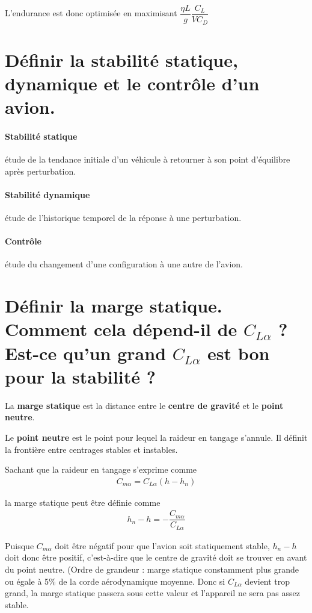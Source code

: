 \documentclass{report}
\begin{document}
L'endurance est donc optimisée en maximisant $\dfrac{\eta L}{g}\dfrac{C_L}{VC_D}$


\section{Définir la stabilité statique, dynamique et le contrôle d'un avion.}


\paragraph{Stabilité statique} étude de la tendance initiale d'un véhicule à retourner à son point d'équilibre après perturbation.

\paragraph{Stabilité dynamique} étude de l'historique temporel de la réponse à une perturbation.

\paragraph{Contrôle} étude du changement d'une configuration à une autre de l'avion.



\section{Définir la marge statique. Comment cela dépend-il de $C_{L\alpha}$ ? Est-ce qu'un grand $C_{L\alpha}$ est bon pour la stabilité ?}

La \textbf{marge statique} est la distance entre le \textbf{centre de gravité} et le \textbf{point neutre}.

Le \textbf{point neutre} est le point pour lequel la raideur en tangage s’annule. Il définit la frontière entre centrages stables et instables.

Sachant que la raideur en tangage s'exprime comme 
\begin{eqnarray}
C_{m\alpha}=C_{L\alpha}(h-h_n)
\end{eqnarray}

la marge statique peut être définie comme
\begin{eqnarray}
h_n-h=-\dfrac{C_{m\alpha}}{C_{L\alpha}}
\end{eqnarray}

Puisque $C_{m\alpha}$ doit être négatif pour que l'avion soit statiquement stable, $h_n-h$ doit donc être positif, c'est-à-dire que le centre de gravité doit se trouver en avant du point neutre. (Ordre de grandeur : marge statique constamment plus grande ou égale à 5$\%$ de la corde aérodynamique moyenne. Donc si $C_{L\alpha}$ devient trop grand, la marge statique passera sous cette valeur et l'appareil ne sera pas assez stable.
\end{document}
